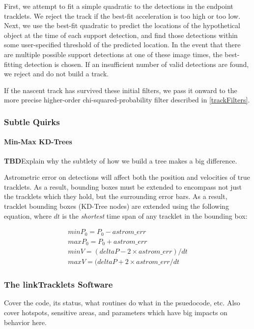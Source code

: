 First, we attempt to fit a simple quadratic to the detections in the
endpoint tracklets.  We reject the track if the best-fit acceleration
is too high or too low.  Next, we use the best-fit quadratic to
predict the locations of the hypothetical object at the time of each
support detection, and find those detections within some
user-specified threshold of the predicted location.  In the event that
there are multiple possible support detections at one of these image
times, the best-fitting detection is chosen.  If an insufficient
number of valid detections are found, we reject and do not build a
track.

If the nascent track has survived these initial filters, we pass it
onward to the more precise higher-order chi-squared-probability filter
described in \ref{trackFilters}.  


\subsubsection{Subtle Quirks}

\paragraph{Min-Max KD-Trees} 

\textbf{TBD}Explain why the subtlety of how we build a tree makes a
big difference.

Astrometric error on detections will affect both the position and
velocities of true tracklets.  As a result, bounding boxes must be
extended to encompass not just the tracklets which they hold, but the
surrounding error bars.  As a result, tracklet bounding boxes (KD-Tree
nodes) are extended using the following equation, where $dt$ is the
\textit{shortest} time span of any tracklet in the bounding box:

\begin{eqnarray}
minP_0 = P_0 - astrom\_err \\
maxP_0 = P_0 + astrom\_err \\
minV = (deltaP - 2\times astrom\_err)/dt  \\
maxV = (deltaP + 2\times astrom\_err /dt
\end{eqnarray}





\subsubsection{The linkTracklets Software}
Cover the code, its status, what routines do what in the psuedocode,
etc.  Also cover hotspots, sensitive areas, and parameters which have
big impacts on behavior here.


